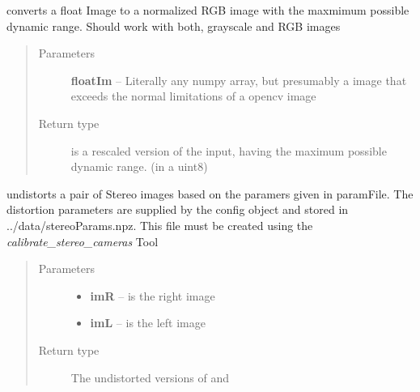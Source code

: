 \documentclass[a4paper,10pt,openany,oneside]{sphinxmanual}
\begin{document}

\begin{fulllineitems}
\label{index:scripts.image_processing.floatIm2RGB}
converts a float Image to a normalized RGB image with the maxmimum possible dynamic range.
Should work with both, grayscale and RGB images
\begin{quote}\begin{description}
\item[{Parameters}] \leavevmode
\textbf{floatIm} -- Literally any numpy array, but presumably a image that exceeds the
normal limitations of a opencv image

\item[{Return type}] \leavevmode
{} is a rescaled version of the input, having the maximum possible dynamic range. (in a uint8)

\end{description}\end{quote}

\end{fulllineitems}


\begin{fulllineitems}
\label{index:scripts.image_processing.undistortStereoPair}
undistorts a pair of Stereo images based on the paramers given in paramFile.
The distortion parameters are supplied by the config object and stored in
../data/stereoParams.npz. This file must be created using the \emph{calibrate\_stereo\_cameras} Tool
\begin{quote}\begin{description}
\item[{Parameters}] \leavevmode\begin{itemize}
\item {}
\textbf{imR} -- is the right image

\item {}
\textbf{imL} -- is the left image

\end{itemize}

\item[{Return type}] \leavevmode
{} The undistorted versions of  and 

\end{description}\end{quote}

\end{fulllineitems}
\end{document}
